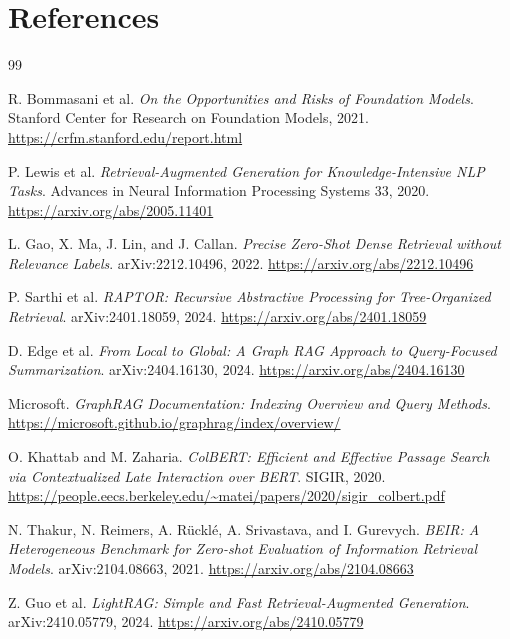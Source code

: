 \section{References}

\begin{thebibliography}{99}

R. Bommasani et al.
\newblock \textit{On the Opportunities and Risks of Foundation Models}.
\newblock Stanford Center for Research on Foundation Models, 2021.
\newblock \url{https://crfm.stanford.edu/report.html}

P. Lewis et al.
\newblock \textit{Retrieval-Augmented Generation for Knowledge-Intensive NLP Tasks}.
\newblock Advances in Neural Information Processing Systems 33, 2020.
\newblock \url{https://arxiv.org/abs/2005.11401}

L. Gao, X. Ma, J. Lin, and J. Callan.
\newblock \textit{Precise Zero-Shot Dense Retrieval without Relevance Labels}.
\newblock arXiv:2212.10496, 2022.
\newblock \url{https://arxiv.org/abs/2212.10496}

P. Sarthi et al.
\newblock \textit{RAPTOR: Recursive Abstractive Processing for Tree-Organized Retrieval}.
\newblock arXiv:2401.18059, 2024.
\newblock \url{https://arxiv.org/abs/2401.18059}

D. Edge et al.
\newblock \textit{From Local to Global: A Graph RAG Approach to Query-Focused Summarization}.
\newblock arXiv:2404.16130, 2024.
\newblock \url{https://arxiv.org/abs/2404.16130}

Microsoft.
\newblock \textit{GraphRAG Documentation: Indexing Overview and Query Methods}.
\newblock \url{https://microsoft.github.io/graphrag/index/overview/}

O. Khattab and M. Zaharia.
\newblock \textit{ColBERT: Efficient and Effective Passage Search via Contextualized Late Interaction over BERT}.
\newblock SIGIR, 2020.
\newblock \url{https://people.eecs.berkeley.edu/~matei/papers/2020/sigir_colbert.pdf}

N. Thakur, N. Reimers, A. Rücklé, A. Srivastava, and I. Gurevych.
\newblock \textit{BEIR: A Heterogeneous Benchmark for Zero-shot Evaluation of Information Retrieval Models}.
\newblock arXiv:2104.08663, 2021.
\newblock \url{https://arxiv.org/abs/2104.08663}

Z. Guo et al.
\newblock \textit{LightRAG: Simple and Fast Retrieval-Augmented Generation}.
\newblock arXiv:2410.05779, 2024.
\newblock \url{https://arxiv.org/abs/2410.05779}


\end{thebibliography}
